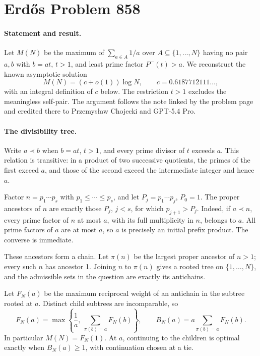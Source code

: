 \section*{Erd\H{o}s Problem 858}

\paragraph{Statement and result.}
Let \(M(N)\) be the maximum of \(\sum_{a\in A}1/a\) over \(A\subseteq\{1,\ldots,N\}\) having no pair \(a,b\) with \(b=at\), \(t>1\), and least prime factor \(P^-(t)>a\). We reconstruct the known asymptotic solution
\[
 M(N)=(c+o(1))\log N,\qquad c=0.6187712111\ldots,
\]
with an integral definition of \(c\) below. The restriction \(t>1\) excludes the meaningless self-pair. The argument follows the note linked by the problem page and credited there to Przemys\l aw Chojecki and GPT-5.4 Pro.

\paragraph{The divisibility tree.}
Write \(a\prec b\) when \(b=at\), \(t>1\), and every prime divisor of \(t\) exceeds \(a\). This relation is transitive: in a product of two successive quotients, the primes of the first exceed \(a\), and those of the second exceed the intermediate integer and hence \(a\).

Factor \(n=p_1\cdots p_s\) with \(p_1\leq\cdots\leq p_s\), and let \(P_j=p_1\cdots p_j\), \(P_0=1\). The proper ancestors of \(n\) are exactly those \(P_j\), \(j<s\), for which \(p_{j+1}>P_j\). Indeed, if \(a\prec n\), every prime factor of \(n\) at most \(a\), with its full multiplicity in \(n\), belongs to \(a\). All prime factors of \(a\) are at most \(a\), so \(a\) is precisely an initial prefix product. The converse is immediate.

These ancestors form a chain. Let \(\pi(n)\) be the largest proper ancestor of \(n>1\); every such \(n\) has ancestor 1. Joining \(n\) to \(\pi(n)\) gives a rooted tree on \(\{1,\ldots,N\}\), and the admissible sets in the question are exactly its antichains.

Let \(F_N(a)\) be the maximum reciprocal weight of an antichain in the subtree rooted at \(a\). Distinct child subtrees are incomparable, so
\[
 F_N(a)=\max\left\{\frac1a,\ \sum_{\pi(b)=a}F_N(b)\right\},
 \qquad B_N(a)=a\sum_{\pi(b)=a}F_N(b). \tag{1}
\]
In particular \(M(N)=F_N(1)\). At \(a\), continuing to the children is optimal exactly when \(B_N(a)\geq1\), with continuation chosen at a tie.


